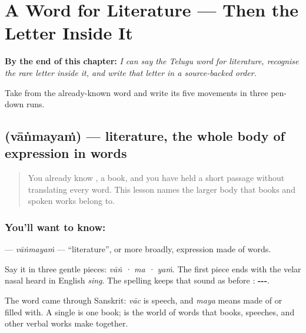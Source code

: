 
\chapter{A Word for Literature — Then the Letter Inside It}
\label{ch:te-vangmayam-nga}

\begin{chapteropening}
\textbf{By the end of this chapter:} \emph{I can say the Telugu word for literature, recognise the rare letter inside it, and write that letter in a source-backed order.}

Take  from the already-known word  and write its five movements in three pen-down runs.
\end{chapteropening}

\section[\texorpdfstring{\te{వాఙ్మయం} (vāṅmayaṁ)}{వాఙ్మయం (vāṅmayaṁ)}]{ (vāṅmayaṁ) — literature, the whole body of expression in words}

\label{lesson:TE-C150-vangmayam}



\begin{quote}
You already know \textbf{}, a book, and you have held a short passage without translating every word. This lesson names the larger body that books and spoken works belong to.
\end{quote}

\subsection*{You'll want to know: }
\textbf{} — \emph{vāṅmayaṁ} — \textquotedblleft{}literature\textquotedblright{}, or more broadly, expression made of words.

Say it in three gentle pieces: \emph{vāṅ · ma · yaṁ}. The first piece ends with the velar nasal heard in English \emph{sing}. The spelling keeps that sound as \textbf{} before \textbf{}: \textbf{---}.

The word came through Sanskrit: \emph{vāc} is speech, and \emph{maya} means made of or filled with. A single \textbf{} is one book; \textbf{} is the world of words that books, speeches, and other verbal works make together.

